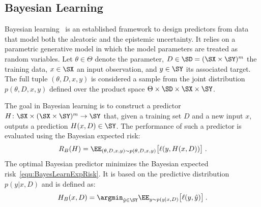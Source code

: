 \subsection{Bayesian Learning}

Bayesian learning~\cite{Bishop-PRML-2006,Gelman-Bayesian-2013} is an established framework to design predictors from data that model both the aleatoric and the epistemic uncertainty. It relies on a parametric generative model in which the model parameters are treated as random variables. Let $\theta \in \Theta$ denote the parameter, $D \in \SD = (\SX \times \SY)^m$ the training data, $x \in \SX$ an input observation, and $y \in \SY$ its associated target. The full tuple $(\theta,D,x,y)$ is considered a sample from the joint distribution $p(\theta,D,x,y)$ defined over the product space $\Theta\times\SD\times\SX\times\SY$.

The goal in Bayesian learning is to construct a predictor $H \colon \SX \times (\SX \times \SY)^m \rightarrow \SY$ that, given a training set $D$ and a new input $x$, outputs a prediction $H(x, D) \in \SY$. The performance of such a predictor is evaluated using the Bayesian expected risk:
\begin{multline}
\label{equ:BayesLearnExpRisk}
R_B(H) = 
 \EE_{(\theta,D,x,y)\sim p(\theta,D,x,y)} \big[\ell(y, H(x, D))\big]\;.
\end{multline}
%
The optimal Bayesian predictor minimizes the Bayesian expected risk~\eqref{equ:BayesLearnExpRisk}. It is based on the predictive distribution
$p(y|x,D)$ and is defined as:
\begin{equation}
\label{equ:LernPredictorBayes}
H_B(x, D) = \argmin_{\hat{y} \in \SY} \EE_{y\sim p(y|x,D)}\big [ \ell(y, \hat{y}) \big ] \:.
\end{equation}
%


